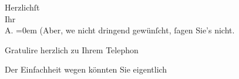 \pstart
           Herzlichſt{\\[\baselineskip]}Ihr{\\[\baselineskip]}\spacefill\mbox{A.}\pend
           \leftskip=0em{}
\pstart
           \noindent{}(Aber, we{\geminationn} nicht dringend gewünſcht,{ }ſagen Sie’s
                  nicht.\pend
           
\pstart
           Gratulire herzlich zu Ihrem Telephon\pend
           
\pstart
           Der Einfachheit wegen könnten Sie eigentlich {\pb}\label{T_L01903-1v}\label{T_L01903-1}\pend
           \endnumbering{}  \newcommand{\dateiname}{L01903}\newcommand{\titel}{Arthur Schnitzler an Richard Beer-Hofmann, 16. 12. 1909}\newcommand{\editorInnen}{Martin Anton Müller und Gerd-Hermann Susen}
